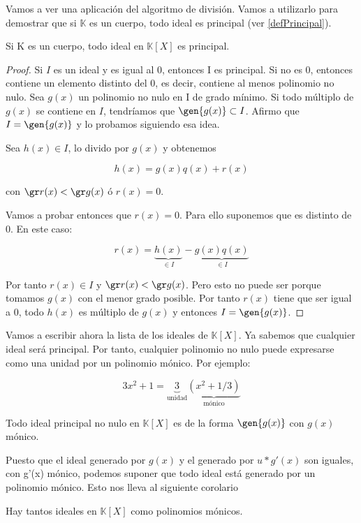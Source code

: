 \documentclass[nochap]{apuntes}
\begin{document}
Vamos a ver una aplicación del algoritmo de división. Vamos a utilizarlo para demostrar que si $\mathbb{K}$  es un cuerpo, todo ideal es principal (ver \ref{defPrincipal}).

\begin{theorem}
 Si K es un cuerpo, todo ideal en $\mathbb{K}[X]$ es principal.
\end{theorem}

\begin{proof}
  Si $I$ es un ideal y es igual al 0, entonces I es principal. Si no es 0, entonces contiene un elemento distinto del 0, es decir, contiene al menos polinomio no nulo. Sea $g(x)$ un polinomio no nulo en I de grado mínimo. Si todo múltiplo de $g(x)$ se contiene en $I$, tendríamos que $\gen{g(x)} \subset I$. Afirmo que $I=\gen{g(x)}$ y lo probamos siguiendo esa idea.
 
 Sea $h(x)\in I$, lo divido por $g(x)$ y obtenemos
 
 \[ h(x)=g(x)q(x)+r(x) \] 
 
 con $\gr r(x) < \gr g(x)$ ó $r(x)=0$.
 
 Vamos a probar entonces que $r(x)=0$. Para ello suponemos que es distinto de 0. En este caso:
 
 \[ r(x)=\underbrace{h(x)}_{\in I}-\underbrace{g(x)q(x)}_{\in I} \]
 
 Por tanto $r(x)\in I$ y $\gr r(x) < \gr g(x)$. Pero esto no puede ser porque tomamos $g(x)$ con el menor grado posible. Por tanto $r(x)$ tiene que ser igual a 0, todo $h(x)$ es múltiplo de $g(x)$ y entonces $I=\gen{g(x)}$.
\end{proof}

Vamos a escribir ahora la lista de los ideales de $\mathbb{K}[X]$. Ya sabemos que cualquier ideal será principal. Por tanto, cualquier polinomio no nulo puede expresarse como una unidad por un polinomio mónico. Por ejemplo:

 \[3x^{2}+1=\underbrace{3}_{\text{unidad}}\underbrace{(x^{2}+1/3)}_{\text{mónico}}\]

\begin{lemma}
 Todo ideal principal no nulo en $\mathbb{K}[X]$  es de la forma $\gen{g(x)}$ con $g(x)$  mónico.
\end{lemma}

Puesto que el ideal generado por $g(x)$ y el generado por $u*g'(x)$ son iguales, con g'(x) mónico, podemos suponer que todo ideal
está generado por un polinomio mónico. Esto nos lleva al siguiente corolario

\begin{corol}
 Hay tantos ideales en $\mathbb{K}[X]$  como polinomios mónicos.
\end{corol}
\end{document}

